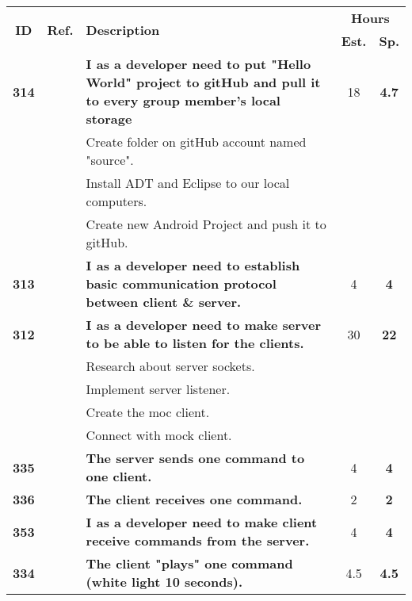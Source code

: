   \label{tab:sprint2stories}
 \def\arraystretch{1.25}
 
\begin{longtable}{ccXcc}
\toprule[1mm]
\multirow{2}{*}{\textbf{ID}} &
\multirow{2}{*}{\textbf{Ref.}} & \multirow{2}{*}{\textbf{Description}} & \multicolumn{2}{c}{\textbf{Hours}} \\
 					& & & \textbf{Est.} & \textbf{Sp.} \\ 				
\midrule
\textbf{314} 	& {M6}
	& {\bf I as a developer need to put "Hello World" project to gitHub and pull it to every group member's local storage} 	& 	18	& \textbf{ 4.7} \\
				&& Create folder on gitHub account named "source".	&  &  \\
				&& Install ADT and Eclipse to our local computers. 	&  &  \\
				&& Create new Android Project and push it to gitHub. 	&  &  \\


\textbf{313} 	& {C1}
	& {\bf I as a developer need to establish basic communication protocol between client \& server.} 	& 		4	& \textbf{4} \\
	
\textbf{312} 	& {C1}
	& {\bf I as a developer need to make server to be able to listen for the clients.} 	& 	30	& \textbf{22} \\
				&& Research about server sockets.	&  &  \\
				&& Implement server listener.	&  &  \\
				&& Create the moc client. &  &  \\
				&& Connect with mock client. &  &  \\
	
\textbf{335} 	& {M6}
	& {\bf The server sends one command to one client. } 	& 		4	& \textbf{4} \\

\textbf{336} 	& {M6}
	& {\bf The client receives one command. } 	& 	2	& \textbf{2} \\

\textbf{353} 	& {M6}
	& {\bf I as a developer need to make client receive commands from the server.} 	& 	4		& \textbf{4} \\

\textbf{334} 	& {M6}
	& {\bf The client "plays" one command (white light 10 seconds). } 	& 		4.5	& \textbf{4.5} \\


\end{longtable}
